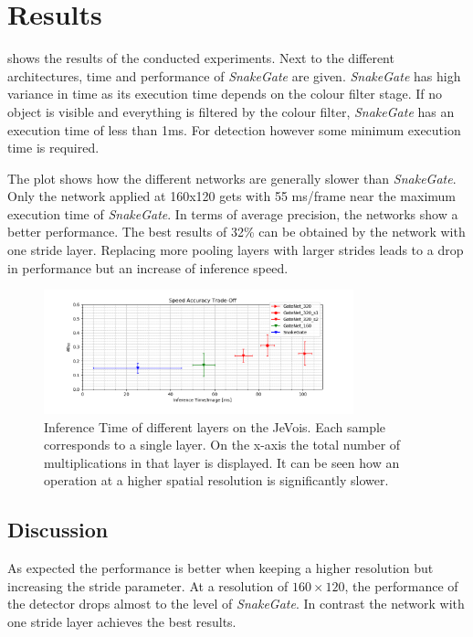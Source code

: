 \section{Results}

 shows the results of the conducted experiments. Next to the different architectures, time and performance of \textit{SnakeGate} are given. \textit{SnakeGate} has high variance in time as its execution time depends on the colour filter stage. If no object is visible and everything is filtered by the colour filter, \textit{SnakeGate} has an execution time of less than 1ms. For detection however some minimum execution time is required.

The plot shows how the different networks are generally slower than \textit{SnakeGate}. Only the network applied at 160x120 gets with 55 ms/frame near the maximum execution time of \textit{SnakeGate}. In terms of average precision, the networks show a better performance. The best results of 32\% can be obtained by the network with one stride layer. Replacing more pooling layers with larger strides leads to a drop in performance but an increase of inference speed.

\begin{figure}[hbtp]
	\centering
	\includegraphics[width=0.8\textwidth]{fig/ap_speed_tradeoff}
	\caption{Inference Time of different layers on the JeVois. Each sample corresponds to a single layer. On the x-axis the total number of multiplications in that layer is displayed. It can be seen how an operation at a higher spatial resolution is significantly slower.}
	\label{fig:ap_speed_tradeoff}
\end{figure}


\subsection{Discussion}

As expected the performance is better when keeping a higher resolution but increasing the stride parameter. At a resolution of $160\times120$, the performance of the detector drops almost to the level of \textit{SnakeGate}. In contrast the network with one stride layer achieves the best results.

